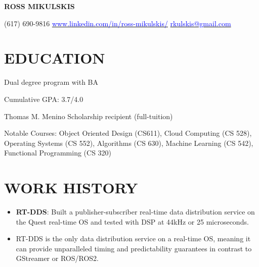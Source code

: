 \documentclass[10pt]{article}
\begin{document}
\begin{FlushLeft}

  \begin{center}
    {\bf ROSS MIKULSKIS}
  \end{center}

  (617) 690-9816 \hfill \hspace{25pt} \href{www.linkedin.com/in/ross-mikulskis/}{\textcolor{blue}{www.linkedin.com/in/ross-mikulskis/}} \hfill \href{mailto:rkulskis@gmail.com}{\textcolor{blue}{rkulskis@gmail.com}}
  \section{EDUCATION}
  \vspace{1.5em}
  \begin{itemize}{
      \item Dual degree program with BA
    }
  \end{itemize}
  
  \begin{itemize}{
    \item Cumulative GPA: 3.7/4.0
    \item Thomas M. Menino Scholarship recipient (full-tuition)
    \item Notable Courses: Object Oriented Design (CS611), Cloud Computing (CS 528), \\ Operating Systems (CS 552), Algorithms (CS 630), Machine Learning (CS 542), \\ Functional Programming (CS 320)
    }
  \end{itemize}

  
\section{WORK HISTORY}

\begin{itemize}
\item \textbf{RT-DDS}: Built a publisher-subscriber real-time data distribution service on the Quest real-time OS and tested with DSP at 44kHz or 25 microseconds.
  \item RT-DDS is the only data distribution service on a real-time OS, meaning it can provide unparalleled timing and predictability guarantees in contrast to GStreamer or ROS/ROS2.
\end{itemize}


\end{FlushLeft}
\end{document}
